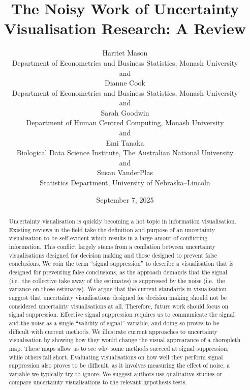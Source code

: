 \documentclass[
  12pt]{article}
\begin{document}
\def\spacingset#1{\renewcommand{\baselinestretch}%
{#1}\small\normalsize} \spacingset{1}



\date{September 7, 2025}
\title{\bf The Noisy Work of Uncertainty Visualisation Research: A
Review}
\author{
Harriet Mason\\
Department of Econometrics and Business Statistics, Monash University\\
and\\Dianne Cook\\
Department of Econometrics and Business Statistics, Monash University\\
and\\Sarah Goodwin\\
Department of Human Centred Computing, Monash University\\
and\\Emi Tanaka\\
Biological Data Science Institute, The Australian National University\\
and\\Susan VanderPlas\\
Statistics Department, University of Nebraska--Lincoln\\
}
\maketitle

\bigskip
\bigskip
\begin{abstract}
Uncertainty visualisation is quickly becoming a hot topic in information
visualisation. Existing reviews in the field take the definition and
purpose of an uncertainty visualisation to be self evident which results
in a large amout of conflicting information. This conflict largely stems
from a conflation between uncertainty visualisations designed for
decision making and those designed to prevent false conclusions. We coin
the term ``signal suppression'' to describe a visualisation that is
designed for preventing false conclusions, as the approach demands that
the signal (i.e.~the collective take away of the estimates) is
suppressed by the noise (i.e.~the variance on those estimates). We argue
that the current standards in visualisation suggest that uncertainty
visualisations designed for decision making should not be considered
uncertainty visualisations at all. Therefore, future work should focus
on signal suppression. Effective signal suppression requires us to
communicate the signal and the noise as a single ``validity of signal''
variable, and doing so proves to be difficult with current methods. We
illustrate current approaches to uncertainty visualisation by showing
how they would change the visual apprearance of a choropleth map. These
maps allow us to see why some methods succeed at signal suppression,
while others fall short. Evaluating visualisations on how well they
perform signal suppression also proves to be difficult, as it involves
measuring the effect of noise, a variable we typically try to ignore. We
suggest authors use qualitative studies or compare uncertainty
visualisations to the relevant hypothesis tests.
\end{abstract}
\end{document}
